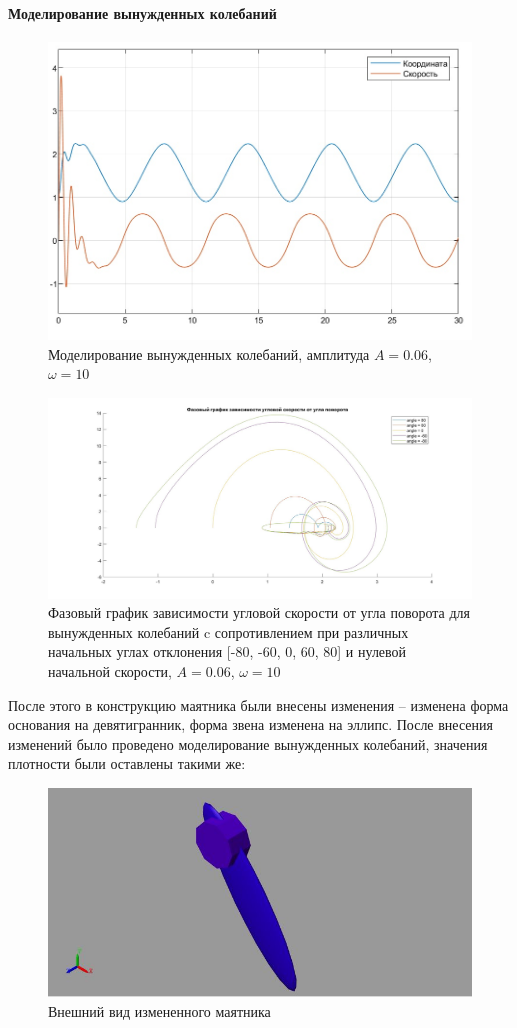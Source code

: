 \documentclass{article}
\begin{document}
	\paragraph*{Моделирование вынужденных колебаний\\}
	\begin{figure}[H]
		\centering
		\includegraphics[width=0.7\linewidth]{coord3}
		\caption{Моделирование вынужденных колебаний, амплитуда $A = 0.06$, $\omega = 10$}
		\label{fig:coord3}
	\end{figure}
	\begin{figure}[H]
		\centering
		\includegraphics[width=1.2\linewidth]{phase3}
		\caption{Фазовый график зависимости угловой скорости от угла поворота для вынужденных колебаний c сопротивлением при различных начальных углах отклонения [-80, -60, 0, 60, 80] и нулевой начальной скорости, $A = 0.06$, $\omega = 10$}
		\label{fig:phase3}
	\end{figure}
	После этого в конструкцию маятника были внесены изменения -- изменена форма основания на девятигранник, форма звена изменена на эллипс. После внесения изменений было проведено моделирование вынужденных колебаний, значения плотности были оставлены такими же:
	\begin{figure}[H]
		\centering
		\includegraphics[width=0.7\linewidth]{pend2}
		\caption{Внешний вид измененного маятника}
		\label{fig:pend2}
	\end{figure}
	
\end{document}
